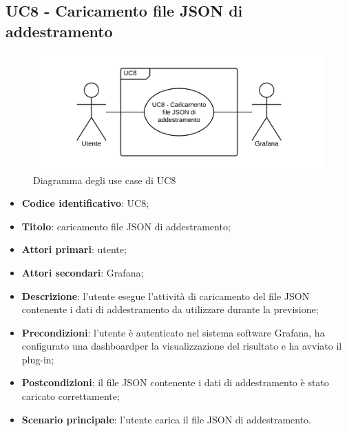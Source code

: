 \subsection{UC8 - Caricamento file JSON di addestramento}
\begin{figure}[H]
\includegraphics{img/UC8_-_Caricamento_file_JSON_di_addestramento.png}
\caption{Diagramma degli use case di UC8}
\end{figure}
\begin{itemize}
	\item \textbf{Codice identificativo}: UC8;
	\item \textbf{Titolo}: caricamento file JSON di addestramento;
	\item \textbf{Attori primari}: utente;
	\item \textbf{Attori secondari}: Grafana\glo;
	\item \textbf{Descrizione}: l'utente esegue l'attività di caricamento del file JSON contenente i dati di addestramento da utilizzare durante la previsione;
	\item \textbf{Precondizioni}: l'utente è autenticato nel sistema software Grafana\glosp, ha configurato una dashboard\glosp per la visualizzazione del risultato e ha avviato il plug-in;
	\item \textbf{Postcondizioni}: il file JSON contenente i dati di addestramento è stato caricato correttamente;
	\item \textbf{Scenario principale}: l'utente carica il file JSON di addestramento.
\end{itemize}